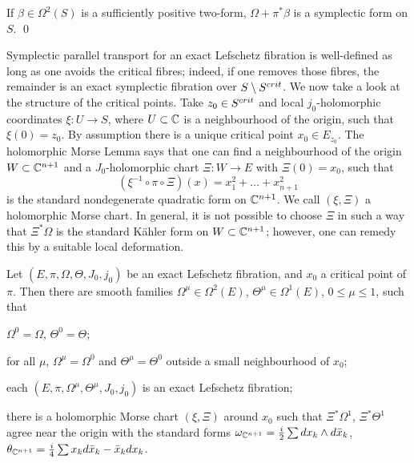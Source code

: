 \documentclass[10pt,letterpaper]{article}
\begin{document}
\begin{lemma} \label{th:add-base}
If $\beta \in \Omega^2(S)$ is a sufficiently positive two-form, $\Omega +
\pi^*\beta$ is a symplectic form on $S$. \qed
\end{lemma}

Symplectic parallel transport for an exact Lefschetz fibration is well-defined
as long as one avoids the critical fibres; indeed, if one removes those fibres,
the remainder is an exact symplectic fibration over $S \setminus S^{crit}$. We
now take a look at the structure of the critical points. Take $z_0 \in S^{crit}$
and local $j_0$-holomorphic coordinates $\xi: U \rightarrow S$, where $U
\subset \mathbb{C}$ is a neighbourhood of the origin, such that $\xi(0) = z_0$. By
assumption there is a unique critical point $x_0 \in E_{z_0}$. The holomorphic
Morse Lemma says that one can find a neighbourhood of the origin $W \subset
\mathbb{C}^{n+1}$ and a $J_0$-holomorphic chart $\Xi: W \rightarrow E$ with $\Xi(0) =
x_0$, such that
\[
(\xi^{-1} \circ \pi \circ \Xi)(x) = x_1^2 + \dots + x_{n+1}^2
\]
is the standard nondegenerate quadratic form on $\mathbb{C}^{n+1}$. We call $(\xi,\Xi)$
a holomorphic Morse chart. In general, it is not possible to choose $\Xi$ in
such a way that $\Xi^*\Omega$ is the standard K{\"a}hler form on $W \subset
\mathbb{C}^{n+1}$; however, one can remedy this by a suitable local deformation.

\begin{lemma} \label{th:local-deformation}
Let $(E,\pi,\Omega,\Theta,J_0,j_0)$ be an exact Lefschetz fibration, and $x_0$
a critical point of $\pi$. Then there are smooth families $\Omega^\mu \in
\Omega^2(E)$, $\Theta^\mu \in \Omega^1(E)$, $0 \leq \mu \leq 1$, such that
\begin{condensedlist}
\item
$\Omega^0 = \Omega$, $\Theta^0 = \Theta$;
\item
for all $\mu$, $\Omega^\mu = \Omega^0$ and $\Theta^\mu = \Theta^0$ outside a
small neighbourhood of $x_0$;
\item
each $(E,\pi,\Omega^\mu,\Theta^\mu,J_0,j_0)$ is an exact Lefschetz fibration;
\item
there is a holomorphic Morse chart $(\xi,\Xi)$ around $x_0$ such that
$\Xi^*\Omega^1$, $\Xi^*\Theta^1$ agree near the origin with the standard forms
$\omega_{\mathbb{C}^{n+1}} = \frac{i}{2} \sum dx_k \wedge d\bar{x}_k$, $\theta_{\mathbb{C}^{n+1}} =
\frac{i}{4} \sum x_k d\bar{x}_k - \bar{x}_k dx_k$.
\end{condensedlist}
\end{lemma}
\end{document}
